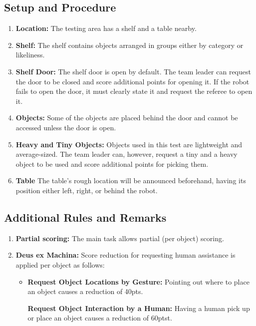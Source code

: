 \subsection*{Setup and Procedure}
\begin{enumerate}
	\item \textbf{Location:} The testing area has a shelf and a table nearby.

	\item \textbf{Shelf:} The shelf contains objects arranged in groups either by category or likeliness.

	\item \textbf{Shelf Door:} The shelf door is open by default.
	The team leader can request the door to be closed and score additional points for opening it. If the robot fails to open the door, it must clearly state it and request the referee to open it.

	\item \textbf{Objects:} Some of the objects are placed behind the door and cannot be accessed unless the door is open.
	
	\item \textbf{Heavy and Tiny Objects:} Objects used in this test are lightweight and average-sized.
	The team leader can, however, request a tiny and a heavy object to be used and score additional points for picking them.

	\item \textbf{Table} The table's rough location will be announced beforehand, having its position either left, right, or behind the robot.
\end{enumerate}


%
%
\subsection*{Additional Rules and Remarks}
\begin{enumerate}
	\item \textbf{Partial scoring:} The main task allows partial (per object) scoring.
	\item \textbf{Deus ex Machina:} Score reduction for requesting human assistance is applied per object as follows:
	\begin{itemize}[nosep]
		\item \textbf{Request Object Locations by Gesture:} Pointing out where to place an object causes a reduction of 40pts.
		
		\textbf{Request Object Interaction by a Human:} Having a human pick up or place an object causes a reduction of 60ptst.
	\end{itemize}
\end{enumerate}

